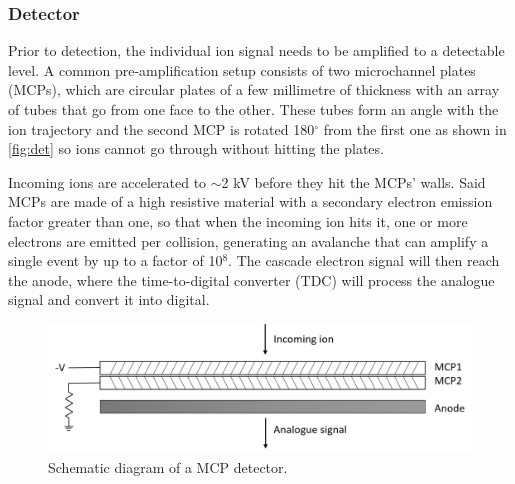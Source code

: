 

\subsubsection{Detector}
Prior to detection, the individual ion signal needs to be amplified to a detectable level. A common pre-amplification setup consists of two microchannel plates (MCPs), which are circular plates of a few millimetre of thickness with an array of tubes that go from one face to the other. These tubes form an angle with the ion trajectory and the second MCP is rotated 180$^{\circ}$ from the first one as shown in \autoref{fig:det} so ions cannot go through without hitting the plates.

Incoming ions are accelerated to $\sim$2 kV before they hit the MCPs' walls. Said MCPs are made of a high resistive material with a secondary electron emission factor greater than one, so that when the incoming ion hits it,  one or more electrons are emitted per collision, generating an avalanche that can amplify a single event by up to a factor of 10$^8$. The cascade electron signal will then reach the anode, where the time-to-digital converter (TDC) will process the analogue signal and convert it into digital.


\begin{figure}%
\centering
\includegraphics[width=0.6\linewidth]{pics/mcp.png}
\centering
\caption{Schematic diagram of a MCP detector.}
\label{fig:det}
\end{figure}


